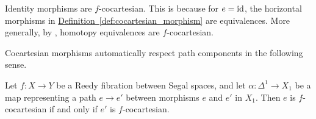 \documentclass[main.tex]{subfiles}
\begin{document}
\begin{example}
  \label{eg:id_and_equiv_are_cocartesian}
  Identity morphisms are $f$-cocartesian. This is because for $e = \mathrm{id}$, the horizontal morphisms in \hyperref[def:cocartesian_morphism]{Definition~\ref*{def:cocartesian_morphism}} are equivalences. More generally, by \cite[Lemma\ 11.6]{rezk2001model}, homotopy equivalences are $f$-cocartesian.
\end{example}

Cocartesian morphisms automatically respect path components in the following sense.

\begin{proposition}
  \label{prop:cocartesian_morphisms_respect_path_components}
  Let $f\colon X \to Y$ be a Reedy fibration between Segal spaces, and let $\alpha\colon \Delta^{1} \to X_{1}$ be a map representing a path $e \to e'$ between morphisms $e$ and $e'$ in $X_{1}$. Then $e$ is $f$-cocartesian if and only if $e'$ is $f$-cocartesian.
\end{proposition}
\end{document}
